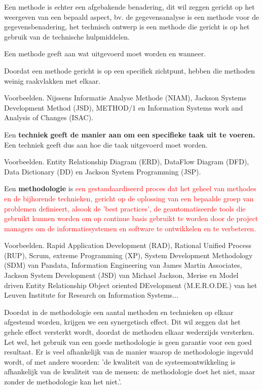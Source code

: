 Een methode is echter een afgebakende benadering, dit wil zeggen gericht op het weergeven van een bepaald aspect, bv. de gegevensanalyse is een methode voor de gegevensbenadering, het technisch ontwerp is een methode die gericht is op het gebruik van de technische hulpmiddelen.

Een methode geeft aan wat uitgevoerd moet worden en wanneer.

Doordat een methode gericht is op een specifiek zichtpunt, hebben die methoden weinig raakvlakken met elkaar.

Voorbeelden. Nijssens Informatie Analyse Methode (NIAM), Jackson Systems Development Method (JSD), METHOD/1 en Information Systems work and Analysis of Changes (ISAC).

Een \textbf{techniek} \textbf{geeft de manier aan om een specifieke taak uit te voeren.} Een techniek geeft dus aan hoe die taak uitgevoerd moet worden.

Voorbeelden. Entity Relationship Diagram (ERD), DataFlow Diagram (DFD), Data Dictionary (DD) en Jackson System Programming (JSP).

Een \textbf{methodologie} is \textcolor{red}{een gestandaardiseerd proces dat het geheel van methodes en de bijhorende technieken, gericht op de oplossing van een bepaalde groep van problemen definieert, alsook de 'best practices', de geautomatiseerde tools die gebruikt kunnen worden om op continue basis gebruikt te worden door de project managers om de informatiesystemen en software te ontwikkelen en te verbeteren.}

Voorbeelden. Rapid Application Development (RAD), Rational Unified Process (RUP), Scrum, extreme Programming (XP), System Development Methodology (SDM) van Pandata, Information Engineering van James Martin Associates, Jackson System Development (JSD) van Michael Jackson, Merise en Model driven Entity Relationship Object oriented DEvelopment (M.E.R.O.DE.) van het Leuven Institute for Research on Information Systems...

Doordat in de methodologie een aantal methoden en technieken op elkaar afgestemd worden, krijgen we een synergetisch effect. Dit wil zeggen dat het gehele effect versterkt wordt, doordat de methoden elkaar wederzijds versterken. Let wel, het gebruik van een goede methodologie is geen garantie voor een goed resultaat. Er is veel afhankelijk van de manier waarop de methodologie ingevuld wordt, of met andere woorden: 'de kwaliteit van de systeemontwikkeling is afhankelijk van de kwaliteit van de mensen: de methodologie doet het niet, maar zonder de methodologie kan het niet.'.

